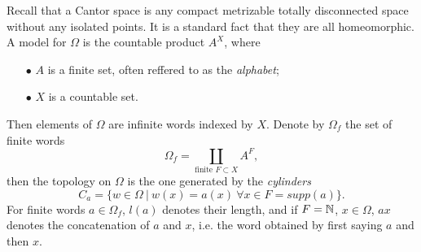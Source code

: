 Recall that a Cantor space is any compact metrizable totally disconnected space without any isolated points. It is a standard fact that they are all homeomorphic. A model for $\Omega$ is the countable product $A^X$, where
\begin{itemize}
\item[$\bullet$] $A$ is a finite set, often reffered to as the \textit{alphabet};
\item[$\bullet$] $X$ is a countable set.
\end{itemize} 
Then elements of $\Omega$ are infinite words indexed by $X$. Denote by $\Omega_f$ the set of finite words \[\Omega_f =\coprod_{\text{finite } F\subset X} A^F,\]
then the topology on $\Omega$ is the one generated by the \textit{cylinders}
\[C_a = \{ w\in \Omega \ | \ w(x)= a(x) \ \forall x\in F=supp(a)\}.\]  
For finite words $a\in \Omega_f$, $l(a)$ denotes their length, and if $F=\mathbb N$, $x\in \Omega$, $ax$ denotes the concatenation of $a$ and $x$, i.e. the word obtained by first saying $a$ and then $x$.\\ 
 
